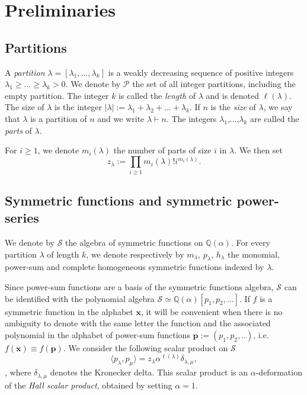 \documentclass[12pt]{amsart}
\theoremstyle{remark}
\newcommand{\bfp}{\boldsymbol{p}}
\newcommand{\bfx}{\boldsymbol{x}}
\newcommand{\QQ}{\mathbb Q}
\newcommand{\YY}{\mathcal{P}}
\newcommand{\mcS}{\mathcal{S}}
\begin{document}
\section{Preliminaries}\label{sec:prel}
\subsection{Partitions}\label{subsec Partitions}
A \textit{partition} $\lambda=[\lambda_1,...,\lambda_k]$ is a weakly decreasing sequence of positive integers $\lambda_1\geq...\geq\lambda_k>0$. We denote by $\YY$ the set of all integer partitions, including the empty partition. The integer $k$ is called the \textit{length} of $\lambda$ and is denoted $\ell(\lambda)$. The size of $\lambda$ is the integer $|\lambda|:=\lambda_1+\lambda_2+...+\lambda_k.$ If $n$ is the \textit{size} of $\lambda$, we say that $\lambda$ is a partition of $n$ and we write $\lambda\vdash n$. The integers $\lambda_1$,...,$\lambda_k$ are called the \textit{parts} of $\lambda$. 




For $i\geq 1$, we denote $m_i(\lambda)$ the number of parts of size $i$ in $\lambda$. We then set 
\begin{equation*}
z_\lambda:=\prod_{i\geq1}m_i(\lambda)!i^{m_i(\lambda)}.  
\end{equation*}





\subsection{Symmetric functions and symmetric power-series}\label{ssec:SymFun}

We denote by $\mcS$ the algebra of symmetric functions on $\QQ(\alpha)$. For every partition $\lambda$ of length $k$, we denote respectively  by $m_\lambda$, $p_\lambda$, $h_\lambda$ the monomial, power-sum and complete homogeneous symmetric functions indexed by $\lambda$.
 

Since power-sum functions are a basis of the symmetric functions algebra, $\mathcal{S}$ can be identified with the polynomial algebra $\mcS\simeq\mathbb{Q}(\alpha)[ p_1,p_2,\dots].$
If $f$ is a symmetric function in the alphabet $\bfx$, it will be convenient when there is no ambiguity to denote with the same letter the function and the associated polynomial in the alphabet of power-sum functions $\bfp:=(p_1,p_2,..)$, i.e. $f(\bfx)\equiv f(\bfp)$. We consider the following scalar product on $\mcS$
\begin{equation}\label{eq scalar product}
  \langle p_\lambda,p_\mu\rangle=z_\lambda\alpha^{\ell(\lambda)}\delta_{\lambda,\mu},  
\end{equation}
, where $\delta_{\lambda,\mu}$ denotes the Kronecker delta.
This scalar product is an $\alpha$-deformation of the \textit{Hall scalar product}, obtained by setting $\alpha=1$. 
\end{document}
